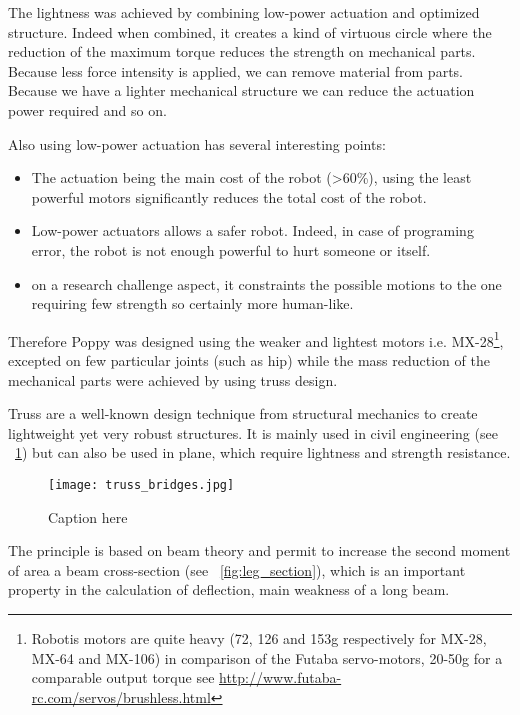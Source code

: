 The lightness was achieved by combining low-power actuation and optimized structure. Indeed when combined, it creates a kind of virtuous circle where the reduction of the maximum torque reduces the strength on mechanical parts. Because less force intensity is applied, we can remove material from parts. Because we have a lighter mechanical structure we can reduce the actuation power required and so on.

Also using low-power actuation has several interesting points:

\begin{itemize}
    \item The actuation being the main cost of the robot (>60\%), using the least powerful motors significantly reduces the total cost of the robot.
    \item Low-power actuators allows a safer robot. Indeed, in case of programing error, the robot is not enough powerful to hurt someone or itself.
    \item on a research challenge aspect, it constraints the possible motions to the one requiring few strength so certainly more human-like.
\end{itemize}

Therefore Poppy was designed using the weaker and lightest motors i.e. MX-28\footnote{Robotis motors are quite heavy (72, 126 and 153g respectively for MX-28, MX-64 and MX-106) in comparison of the Futaba servo-motors, 20-50g for a comparable output torque see \url{http://www.futaba-rc.com/servos/brushless.html}}, excepted on few particular joints (such as hip) while the mass reduction of the mechanical parts were achieved by using truss design.

Truss are a well-known design technique from structural mechanics to create lightweight yet very robust structures. It is mainly used in civil engineering (see \figurename~\ref{fig:truss_bridges}) but can also be used in plane, which require lightness and strength resistance.

\begin{figure}[tb]
    \begin{center}
        \texttt{[image: truss\_bridges.jpg]}
    \end{center}
    \caption{Caption here}
    \label{fig:truss_bridges}
\end{figure}

The principle is based on beam theory and permit to increase the second moment of area a beam cross-section (see \figurename~\ref{fig:leg_section}), which is an important property in the calculation of deflection, main weakness of a long beam.

